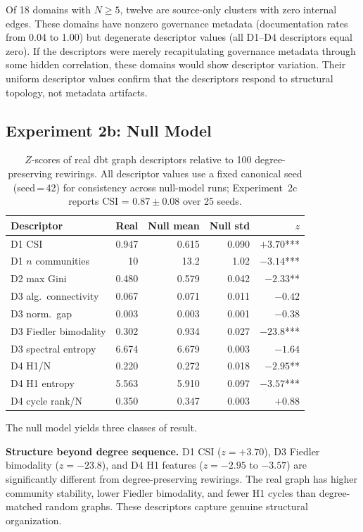 \documentclass[11pt,a4paper]{article}
\begin{document}
Of 18 domains with $N \geq 5$, twelve are source-only clusters with
zero internal edges. These domains have nonzero governance metadata
(documentation rates from 0.04 to 1.00) but degenerate descriptor
values (all D1--D4 descriptors equal zero). If the descriptors were
merely recapitulating governance metadata through some hidden
correlation, these domains would show descriptor variation. Their
uniform descriptor values confirm that the descriptors respond to
structural topology, not metadata artifacts.

\subsection{Experiment 2b: Null Model}

\begin{table}[htb]
\centering
\caption{$Z$-scores of real dbt graph descriptors relative to
  100 degree-preserving rewirings. All descriptor values use a fixed
  canonical seed (seed\,=\,42) for consistency across null-model runs;
  Experiment~2c reports CSI = $0.87 \pm 0.08$ over 25 seeds.}
\label{tab:null}
\begin{tabular}{lrrrr}
\toprule
Descriptor & Real & Null mean & Null std & $z$ \\
\midrule
D1 CSI & 0.947 & 0.615 & 0.090 & $+3.70$*** \\
D1 $n$ communities & 10 & 13.2 & 1.02 & $-3.14$*** \\
D2 max Gini & 0.480 & 0.579 & 0.042 & $-2.33$** \\
D3 alg.\ connectivity & 0.067 & 0.071 & 0.011 & $-0.42$ \\
D3 norm.\ gap & 0.003 & 0.003 & 0.001 & $-0.38$ \\
D3 Fiedler bimodality & 0.302 & 0.934 & 0.027 & $-23.8$*** \\
D3 spectral entropy & 6.674 & 6.679 & 0.003 & $-1.64$ \\
D4 H1/N & 0.220 & 0.272 & 0.018 & $-2.95$** \\
D4 H1 entropy & 5.563 & 5.910 & 0.097 & $-3.57$*** \\
D4 cycle rank/N & 0.350 & 0.347 & 0.003 & $+0.88$ \\
\bottomrule
\end{tabular}
\end{table}

The null model yields three classes of result.

\textbf{Structure beyond degree sequence.} D1 CSI ($z = +3.70$),
D3 Fiedler bimodality ($z = -23.8$), and D4 H1 features ($z = -2.95$
to $-3.57$) are significantly different from degree-preserving rewirings.
The real graph has higher community stability, lower Fiedler bimodality,
and fewer H1 cycles than degree-matched random graphs. These descriptors
capture genuine structural organization.
\end{document}
